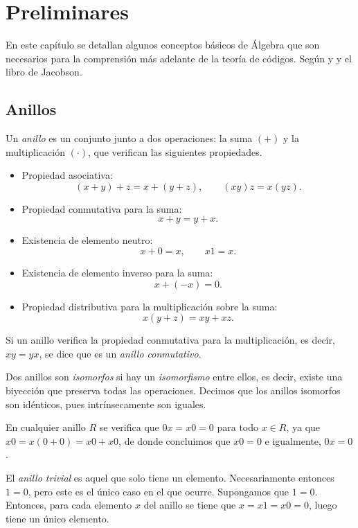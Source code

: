 \chapter{Preliminares}

En este capítulo se detallan algunos conceptos básicos de Álgebra que son necesarios para la comprensión más adelante de la teoría de códigos. Según \parencite{cohn_algebra_1982} y \parencite{cohn_algebra_1989} y el libro de Jacobson.

\section{Anillos}

\begin{definition}
  Un \textit{anillo} es un conjunto junto a dos operaciones: la suma \((+)\) y la multiplicación \((\cdot)\), que verifican las siguientes propiedades.
  \begin{itemize}[itemsep=0pt]
    \item Propiedad asociativa:
    \[(x+y)+z = x + (y+z), \qquad (xy)z = x(yz).\]
    \item Propiedad conmutativa para la suma:
    \[x + y = y + x.\]
    \item Existencia de elemento neutro:
    \[x + 0 = x, \qquad x1 = x.\]
    \item Existencia de elemento inverso para la suma:
    \[x + (-x) = 0.\]
    \item Propiedad distributiva para la multiplicación sobre la suma:
    \[x(y+z) = xy + xz.\]
  \end{itemize}

  Si un anillo verifica la propiedad conmutativa para la multiplicación, es decir, \(xy = yx\), se dice que es un \textit{anillo conmutativo}.
\end{definition}

Dos anillos son \textit{isomorfos} si hay un \textit{isomorfismo} entre ellos, es decir, existe una biyección que preserva todas las operaciones.
Decimos que los anillos isomorfos son idénticos, pues intrínsecamente son iguales.

En  cualquier anillo \(R\) se verifica que \(0x = x0 = 0\) para todo \(x \in R\), ya que \(x0 = x(0+0) = x0 + x0\), de donde concluimos que \(x0 = 0\) e igualmente, \(0x = 0\).

El \textit{anillo trivial} es aquel que solo tiene un elemento. 
Necesariamente entonces \(1 = 0\), pero este es el único caso en el que ocurre. 
Supongamos que \(1 = 0\). 
Entonces, para cada elemento \(x\) del anillo se tiene que \(x = x1 = x0 = 0\), luego tiene un único elemento.

